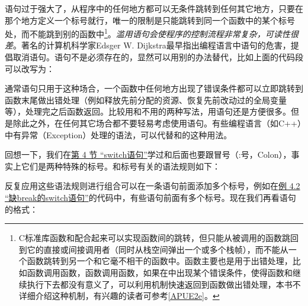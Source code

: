 语句过于强大了，从程序中的任何地方都可以无条件跳转到任何其它地方，只要在那个地方定义一个标号就行，唯一的限制是只能跳转到同一个函数中的某个标号处，而不能跳到别的函数中\footnote[11]{C标准库函数和配合起来可以实现函数间的跳转，但只能从被调用的函数跳回到它的直接或间接调用者（同时从栈空间弹出一个或多个栈帧），而不能从一个函数跳转到另一个和它毫不相干的函数中。函数主要也是用于出错处理，比如函数调用函数，函数调用函数，如果在中出现某个错误条件，使得函数和继续执行下去都没有意义了，可以利用机制快速返回到函数做出错处理，本书不详细介绍这种机制，有兴趣的读者可参考\hyperlink{db.bi01.bibli.apue}{[APUE2e]}。}。\emph{滥用语句会使程序的控制流程非常复杂，可读性很差}。著名的计算机科学家Edsger W.\BookSplit{} Dijkstra最早指出编程语言中语句的危害，提倡取消语句。语句不是必须存在的，显然可以用别的办法替代，比如上面的代码段可以改写为：




通常语句只用于这种场合，一个函数中任何地方出现了错误条件都可以立即跳转到函数末尾做出错处理（例如释放先前分配的资源、恢复先前改动过的全局变量等），处理完之后函数返回。比较用和不用的两种写法，用语句还是方便很多。但是除此之外，在任何其它场合都不要轻易考虑使用语句。有些编程语言（如C+\BookSplit{}+\BookSplit{}）中有异常（Exception）处理的语法，可以代替和的这种用法。



回想一下，我们在\hyperlink{db.ch04s04.id2719538}{第 4 节 “switch语句”}学过和后面也要跟冒号（:号，Colon），事实上它们是两种特殊的标号。和标号有关的语法规则如下：


\begin{BookLiteral}
\end{BookLiteral}


反复应用这些语法规则进行组合可以在一条语句前面添加多个标号，例如在\hyperlink{db.ch04s04.id2719735}{例 4.\BookSplit{}2 “缺break的switch语句”}的代码中，有些语句前面有多个标号。现在我们再看语句的格式：



